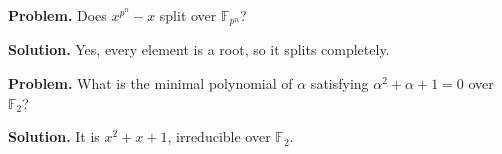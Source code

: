 \begin{example}\label{ex:sec7-9}
\textbf{Problem.} Does $x^{p^n}-x$ split over $\mathbb{F}_{p^n}$?

\textbf{Solution.} Yes, every element is a root, so it splits completely.
\end{example}

\begin{example}\label{ex:sec7-10}
\textbf{Problem.} What is the minimal polynomial of $\alpha$ satisfying $\alpha^2+\alpha+1=0$ over $\mathbb{F}_2$?

\textbf{Solution.} It is $x^2+x+1$, irreducible over $\mathbb{F}_2$.
\end{example}
